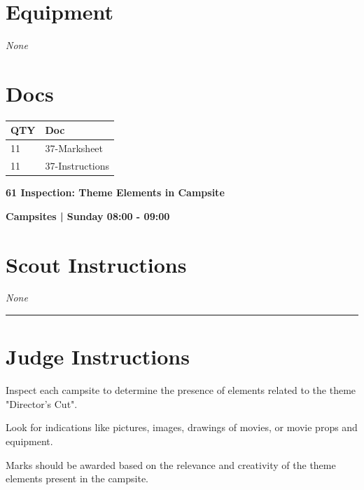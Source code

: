 \documentclass[10pt]{article}
\newcommand{\newtitle}[1]{\begin{center}{\Huge\bfseries #1 }\\ \vspace{5mm}\end{center}}
\newcommand{\newsubtitle}[1]{\begin{center}{\color{grey}\Large\bfseries #1 }\\ \vspace{5mm}\end{center}}
\begin{document}
	\begin{multicols}{2}

		\section*{\faWrench \: Equipment}

				\textit{None}
		
		\vfill\null
		\columnbreak

			\section*{\faFile \: Docs}
		 	\begin{center}
			\begin{tabular}{p{2cm}p{4cm}}

			\textbf{QTY} & \textbf{Doc} \\\toprule
										11&37-Marksheet\\\midrule
										11&37-Instructions\\\midrule
							\end{tabular}
			\end{center}
	

		\vfill\null

		\end{multicols}



	\vspace{1cm}


	\clearpage
		\newtitle{61 Inspection: Theme Elements in Campsite }
	\newsubtitle{Campsites | Sunday 08:00 - 09:00}
		\setcounter{section}{60}
	\section*{Scout Instructions}
		\textit{None}
	
	\vspace{0.5cm}
	\hrule
	\vspace{0.5cm}

		\section*{Judge Instructions}
		Inspect each campsite to determine the presence of elements related to the theme "Director's Cut". 

Look for indications like pictures, images, drawings of movies, or movie props and equipment. 

Marks should be awarded based on the relevance and creativity of the theme elements present in the campsite.
\end{document}
